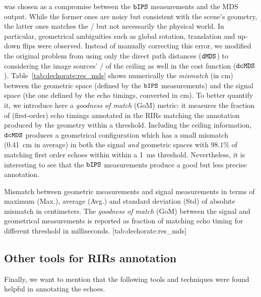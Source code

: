  was chosen as a compromise between the $\mathtt{bIPS}$ measurements and the \ac{MDS} output.
While the former ones are noisy but consistent with the scene's geometry, the latter ones matches the \TOAs/ but not necessarily the physical world.
In particular, geometrical ambiguities such as global rotation, translation and up-down flips were observed.
Instead of manually correcting this error, we modified the original problem from using only the direct path distances ($\mathtt{dMDS}$) to considering the  image sources' \TOA/ of the ceiling as well in the cost function ($\mathtt{dcMDS}$).
Table~\ref{tab:dechorate:res_mds} shows numerically the \textit{mismatch} (in cm) between the geometric space (defined by the $\mathtt{bIPS}$ measurements) and the signal space (the one defined by the echo timings, converted in cm).
To better quantify it, we introduce here a \textit{goodness of match} (GoM) metric: it measures the fraction of (first-order) echo timings annotated in the \acp{RIR} matching the annotation produced by the geometry within a threshold.
Including the ceiling information, $\mathtt{dcMDS}$ produces a geometrical configuration which has a small mismatch (0.41~cm in average) in both the signal \textit{and} geometric spaces with $98.1\%$ of matching first order echoes within within a 1~ms threshold.
Nevertheless, it is interesting to see that the $\mathtt{bIPS}$ measurements produce a good but less precise annotation.

\begin{table}[]
    \begin{sidecaption}[]{
        Mismatch between geometric measurements and signal measurements in terms of maximum (Max.), average (Avg.) and standard deviation (Std) of absolute mismatch in centimeters. The \textit{goodness of match} (GoM) between the signal and geometrical measurements is reported as fraction of matching echo timing for different threshold in milliseconds.
        }[tab:dechorate:res_mds]
        \centering
        \small
        
    \end{sidecaption}
\end{table}

\subsection{Other tools for RIRs annotation}
Finally, we want to mention that the following tools and techniques were found helpful in annotating the echoes.

